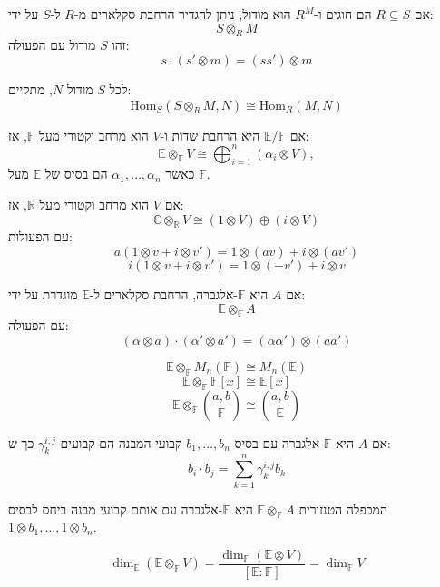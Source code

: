 \documentclass{tstextbook}
\begin{document}
\begin{definition}
אם \(R \subseteq S\) הם חוגים ו-\(R^{M}\) הוא מודול, ניתן להגדיר הרחבת סקלארים מ-\(R\) ל-\(S\) על ידי:
$$S \otimes_{R} M$$
זהו \(S\) מודול עם הפעולה:
$$s \cdot (s' \otimes m) = (s s') \otimes m$$

\end{definition}
\begin{proposition}
לכל \(S\) מודול \(N\), מתקיים:
$$\mathrm{Hom}_{S}(S \otimes_{R} M, N) \cong \mathrm{Hom}_{R}(M, N)$$

\end{proposition}
\begin{example}
אם \(\mathbb{E} / \mathbb{F}\) היא הרחבת שדות ו-\(V\) הוא מרחב וקטורי מעל \(\mathbb{F}\), אז:
$$\mathbb{E} \otimes_{\mathbb{F}} V \cong \bigoplus_{i=1}^{n} (\alpha_{i} \otimes V),$$
כאשר \(\alpha_{1}, \dots, \alpha_{n}\) הם בסיס של \(\mathbb{E}\) מעל \(\mathbb{F}\).

\end{example}
\begin{example}
אם \(V\) הוא מרחב וקטורי מעל \(\mathbb{R}\), אז:
$$\mathbb{C} \otimes_{\mathbb{R}} V \cong (1 \otimes V) \oplus (i \otimes V)$$
עם הפעולות:
$$a(1 \otimes v + i \otimes v') = 1 \otimes (a v) + i \otimes (a v')$$$$i(1 \otimes v + i \otimes v') = 1 \otimes (-v') + i \otimes v$$

\end{example}
\begin{definition}
אם \(A\) היא \(\mathbb{F}\)-אלגברה, הרחבת סקלארים ל-\(\mathbb{E}\) מוגדרת על ידי:
$$\mathbb{E} \otimes_{\mathbb{F}} A$$
עם הפעולה:
$$(\alpha \otimes a) \cdot (\alpha' \otimes a') = (\alpha \alpha') \otimes (a a')$$

\end{definition}
\begin{example}
$$\mathbb{E} \otimes_{\mathbb{F}} M_{n}(\mathbb{F}) \cong M_{n}(\mathbb{E})$$$$\mathbb{E} \otimes_{\mathbb{F}} \mathbb{F}[x] \cong \mathbb{E}[x]$$$$\mathbb{E} \otimes_{\mathbb{F}} \left( \frac{a, b}{\mathbb{F}} \right) \cong \left( \frac{a, b}{\mathbb{E}} \right)$$

\end{example}
\begin{definition}
אם \(A\) היא \(\mathbb{F}\)-אלגברה עם בסיס \(b_{1}, \dots, b_{n}\) קבועי המבנה הם קבועים \(\gamma_{k}^{i,j}\) כך ש:
$$b_{i} \cdot b_{j} = \sum_{k=1}^{n} \gamma_{k}^{i,j} b_{k}$$

\end{definition}
\begin{proposition}
המכפלה הטנזורית \(\mathbb{E} \otimes_{\mathbb{F}} A\) היא \(\mathbb{E}\)-אלגברה עם אותם קבועי מבנה ביחס לבסיס \(1 \otimes b_{1}, \dots, 1 \otimes b_{n}\).

\end{proposition}
\begin{proposition}
$$\dim_{\mathbb{E}} (\mathbb{E} \otimes_{\mathbb{F}} V) = \frac{\dim_{\mathbb{F}} (\mathbb{E} \otimes V)}{[\mathbb{E} : \mathbb{F}]} = \dim_{\mathbb{F}} V$$

\end{proposition}
\end{document}
